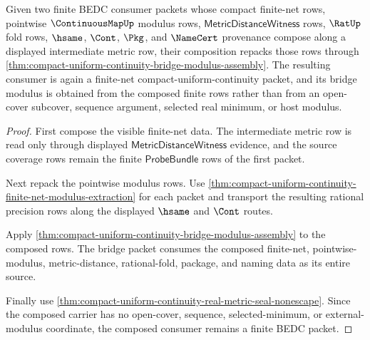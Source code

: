\begin{theorem}
\label{thm:compact-uniform-continuity-finite-net-composition-example}
Given two finite BEDC consumer packets whose compact finite-net rows, pointwise $\ContinuousMapUp$ modulus rows, $\mathsf{MetricDistanceWitness}$ rows, $\RatUp$ fold rows, $\hsame$, $\Cont$, $\Pkg$, and $\NameCert$ provenance compose along a displayed intermediate metric row, their composition repacks those rows through \autoref{thm:compact-uniform-continuity-bridge-modulus-assembly}. The resulting consumer is again a finite-net compact-uniform-continuity packet, and its bridge modulus is obtained from the composed finite rows rather than from an open-cover subcover, sequence argument, selected real minimum, or host modulus.
\end{theorem}
\begin{proof}
First compose the visible finite-net data. The intermediate metric row is read only through displayed $\mathsf{MetricDistanceWitness}$ evidence, and the source coverage rows remain the finite $\mathsf{ProbeBundle}$ rows of the first packet.

Next repack the pointwise modulus rows. Use \autoref{thm:compact-uniform-continuity-finite-net-modulus-extraction} for each packet and transport the resulting rational precision rows along the displayed $\hsame$ and $\Cont$ routes.

Apply \autoref{thm:compact-uniform-continuity-bridge-modulus-assembly} to the composed rows. The bridge packet consumes the composed finite-net, pointwise-modulus, metric-distance, rational-fold, package, and naming data as its entire source.

Finally use \autoref{thm:compact-uniform-continuity-real-metric-seal-nonescape}. Since the composed carrier has no open-cover, sequence, selected-minimum, or external-modulus coordinate, the composed consumer remains a finite BEDC packet.
\end{proof}

